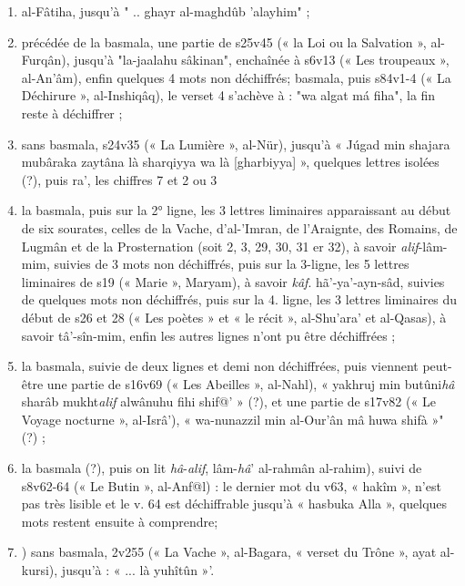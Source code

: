 \begin{enumerate}
   \item al-Fâtiha, jusqu'à
" .. ghayr al-maghdûb 'alayhim" ;
  \item précédée de la basmala, une partie de s25v45 (« la Loi ou la
Salvation », al-Furqân), jusqu'à "la-jaalahu sâkinan", enchaînée à s6v13
(« Les troupeaux », al-An'âm), enfin quelques 4 mots non déchiffrés;
  \itemla basmala, puis s84v1-4 (« La Déchirure », al-Inshiqâq), le verset
4 s'achève à : "wa algat má fiha", la fin reste à déchiffrer ;
  \item sans basmala, s24v35 (« La Lumière », al-Nür), jusqu'à « Júgad
min shajara mubâraka zaytâna là sharqiyya wa là [gharbiyya] », quelques lettres isolées (?), puis ra', les chiffres 7 et 2 ou 3
  \item la basmala, puis sur la 2° ligne, les 3 lettres liminaires apparaissant
au début de six sourates, celles de la Vache, d'al-'Imran, de l'Araignte, des Romains, de Lugmân et de la Prosternation (soit 2, 3, 29, 30, 31 er
32), à savoir \textit{alif}-lâm-mim, suivies de 3 mots non déchiffrés, puis sur la 3-ligne, les 5 lettres liminaires de s19 (« Marie », Maryam), à savoir \textit{kâf}.
hã'-ya'-ayn-sâd, suivies de quelques mots non déchiffrés, puis sur la 4. ligne, les 3 lettres liminaires du début de s26 et   28 (« Les poètes » et « le
récit », al-Shu'ara' et al-Qasas), à savoir tâ'-sîn-mim, enfin les autres
lignes n'ont pu être déchiffrées ;
  \item la basmala, suivie de deux lignes et demi non déchiffrées, puis viennent peut-être une partie de s16v69 (« Les Abeilles », al-Nahl),
« yakhruj min butûni\textit{hâ} sharâb mukht\textit{alif} alwânuhu fihi shif@' » (?), et une partie de s17v82 (« Le Voyage nocturne », al-Isrâ'), « wa-nunazzil
min al-Our'ân mâ huwa shifà »" (?) ;
  \item la basmala (?), puis on lit \textit{hâ}-\textit{alif}, lâm-\textit{hâ}' al-rahmân al-rahim), suivi de s8v62-64 (« Le Butin », al-Anf@l) : le dernier mot du v63,
« hakîm », n'est pas très lisible et le v. 64 est déchiffrable jusqu'à « hasbuka Alla », quelques mots restent ensuite à comprendre;
  \item) sans basmala, 2v255 (« La Vache », al-Bagara, « verset du
Trône », ayat al-kursi), jusqu'à : « ... là yuhîtûn »'.
\end{enumerate}

